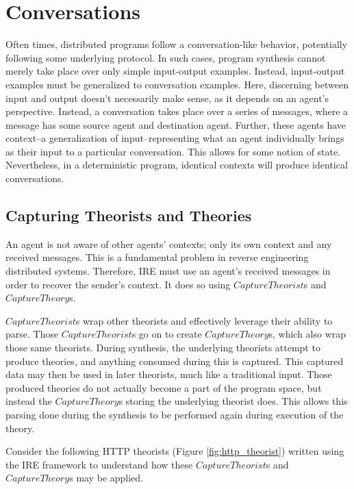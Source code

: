 \chapter{Conversations}

Often times, distributed programs follow a conversation-like behavior, potentially following some underlying protocol.
In such cases, program synthesis cannot merely take place over only simple input-output examples.
Instead, input-output examples must be generalized to conversation examples.
Here, discerning between input and output doesn't necessarily make sense, as it depends on an agent's perspective.
Instead, a conversation takes place over a series of messages, where a message has some source agent and destination agent.
Further, these agents have context--a generalization of input--representing what an agent individually brings as their input to a particular conversation.
This allows for some notion of state.
Nevertheless, in a deterministic program, identical contexts will produce identical conversations.


\section{Capturing Theorists and Theories}

An agent is not aware of other agents' contexts; only its own context and any received messages.
This is a fundamental problem in reverse engineering distributed systems.
Therefore, IRE must use an agent's received messages in order to recover the sender's context.
It does so using $CaptureTheorist$s and $CaptureTheory$s.

$CaptureTheorist$s wrap other theorists and effectively leverage their ability to parse.
Those $CaptureTheorist$s go on to create $CaptureTheory$s, which also wrap those same theorists.
During synthesis, the underlying theorists attempt to produce theories, and anything consumed during this is captured.
This captured data may then be used in later theorists, much like a traditional input.
Those produced theories do not actually become a part of the program space, but instead the $CaptureTheory$s storing the underlying theorist does.
This allows this parsing done during the synthesis to be performed again during execution of the theory.


Consider the following HTTP theorists (Figure \ref{fig:http_theorist}) written using the IRE framework to understand how these $CaptureTheorist$s and $CaptureTheory$s may be applied.


